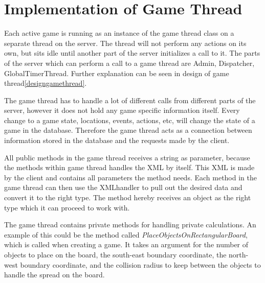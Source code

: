 \section{Implementation of Game Thread}
\label{sec:gamethreadimpl}
Each active game is running as an instance of the game thread class on a separate thread on the server. The thread will not perform any actions on its own, but sits idle until another part of the server initializes a call to it. The parts of the server which can perform a call to a game thread are Admin, Dispatcher, GlobalTimerThread. Further explanation can be seen in design of game thread\ref{designgamethread}. 

The game thread has to handle a lot of different calls from different parts of the server, however it does not hold any game specific information itself. Every change to a game state, locations, events, actions, etc, will change the state of a game in the database. Therefore the game thread acts as a connection between information stored in the database and the requests made by the client.

All public methods in the game thread receives a string as parameter, because the methods within game thread handles the XML by itself. This XML is made by the client and contains all parameters the method needs. Each method in the game thread can then use the XMLhandler to pull out the desired data and convert it to the right type. The method hereby receives an object as the right type which it can proceed to work with.

The game thread contains private methods for handling private calculations. An example of this could be the method called \textit{PlaceObjectsOnRectangularBoard}, which is called when creating a game. It takes an argument for the number of objects to place on the board, the south-east boundary coordinate, the north-west boundary coordinate, and the collision radius to keep between the objects to handle the spread on the board. 


